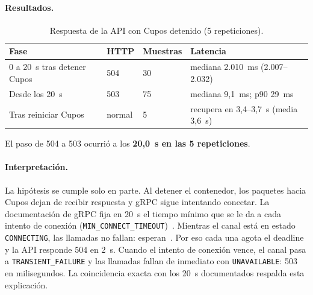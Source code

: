 \documentclass[11pt,spanish]{article}
\begin{document}
\paragraph{Resultados.}

\begin{table}[H]
\centering
\small
\begin{tabularx}{\textwidth}{p{4.8cm} p{1.2cm} p{1.4cm} X}
\toprule
\textbf{Fase} & \textbf{HTTP} & \textbf{Muestras} & \textbf{Latencia} \\
\midrule
0 a 20~s tras detener Cupos & 504 & 30 & mediana 2.010~ms (2.007--2.032) \\
Desde los 20~s & 503 & 75 & mediana 9,1~ms; p90 29~ms \\
Tras reiniciar Cupos & normal & 5 & recupera en 3,4--3,7~s (media 3,6~s) \\
\bottomrule
\end{tabularx}
\caption{Respuesta de la API con Cupos detenido (5 repeticiones).}
\end{table}

El paso de 504 a 503 ocurrió a los \textbf{20,0~s en las 5 repeticiones}.

\paragraph{Interpretación.} La hipótesis se cumple solo en parte. Al detener el contenedor, los paquetes hacia Cupos dejan de recibir respuesta y gRPC sigue intentando conectar. La documentación de gRPC fija en 20~s el tiempo mínimo que se le da a cada intento de conexión (\texttt{MIN\_CONNECT\_TIMEOUT})~\cite{grpcbackoff}. Mientras el canal está en estado \texttt{CONNECTING}, las llamadas no fallan: esperan~\cite{grpcwaitforready}. Por eso cada una agota el deadline y la API responde 504 en 2~s. Cuando el intento de conexión vence, el canal pasa a \texttt{TRANSIENT\_FAILURE} y las llamadas fallan de inmediato con \texttt{UNAVAILABLE}: 503 en milisegundos. La coincidencia exacta con los 20~s documentados respalda esta explicación.
\end{document}
